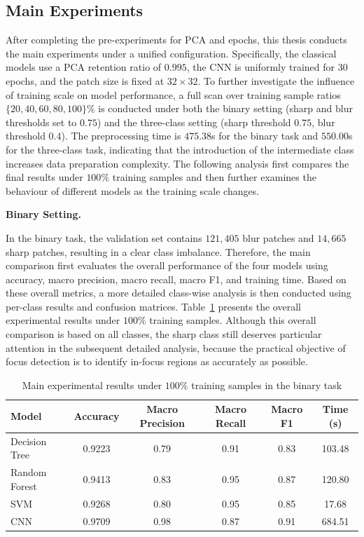 \subsection{Main Experiments}

\par After completing the pre-experiments for PCA and epochs, this thesis
conducts the main experiments under a unified configuration. Specifically, the
classical models use a PCA retention ratio of $0.995$, the CNN is uniformly
trained for $30$ epochs, and the patch size is fixed at $32\times 32$. To
further investigate the influence of training scale on model performance, a
full scan over training sample ratios \(\{20,40,60,80,100\}\%\) is conducted
under both the binary setting (sharp and blur thresholds set to $0.75$) and
the three-class setting (sharp threshold $0.75$, blur threshold $0.4$). The
preprocessing time is $475.38$s for the binary task and $550.00$s for the
three-class task, indicating that the introduction of the intermediate class
increases data preparation complexity. The following analysis first compares
the final results under $100\%$ training samples and then further examines the
behaviour of different models as the training scale changes.

\par\medskip \noindent\textbf{Binary Setting.}
\par In the binary task, the validation set contains $121,405$ blur patches
and $14,665$ sharp patches, resulting in a clear class imbalance. Therefore,
the main comparison first evaluates the overall performance of the four models
using accuracy, macro precision, macro recall, macro F1, and training time.
Based on these overall metrics, a more detailed class-wise analysis is then
conducted using per-class results and confusion matrices.
Table~\ref{tab:main-binary-100} presents the overall experimental results under
$100\%$ training samples.
Although this overall comparison is based on all classes, the sharp class still
deserves particular attention in the subsequent detailed analysis, because the
practical objective of focus detection is to identify in-focus regions as
accurately as possible.

\begin{table}[htbp]
    \centering
    \caption{Main experimental results under $100\%$ training samples in the binary task}
    \label{tab:main-binary-100}
    \begin{tabular}{lccccc}
        \toprule
        Model & Accuracy & Macro Precision &
        Macro Recall & Macro F1 & Time (s) \\
        \midrule
        Decision Tree & 0.9223 & 0.79 & 0.91 & 0.83 & 103.48 \\
        Random Forest & 0.9413 & 0.83 & 0.95 & 0.87 & 120.80 \\
        SVM           & 0.9268 & 0.80 & 0.95 & 0.85 & 17.68  \\
        CNN           & 0.9709 & 0.98 & 0.87 & 0.91 & 684.51 \\
        \bottomrule
    \end{tabular}
\end{table}

